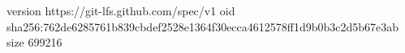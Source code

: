 version https://git-lfs.github.com/spec/v1
oid sha256:762de6285761b839cbdef2528e1364f30ecca4612578ff1d9b0b3c2d5b67e3ab
size 699216
